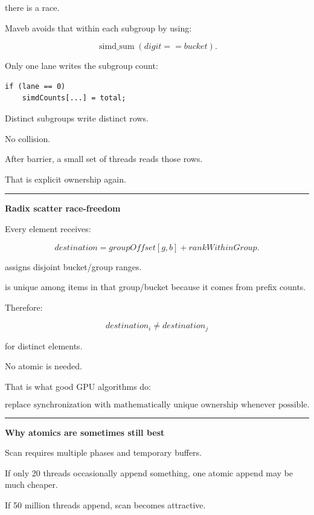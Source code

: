 there is a race.

Maveb avoids that within each subgroup by using:

\[
\operatorname{simd\_sum}(digit==bucket).
\]

Only one lane writes the subgroup count:

\protect{}\label{yjtusl}%
\begin{verbatim}
if (lane == 0)
    simdCounts[...] = total;
\end{verbatim}

Distinct subgroups write distinct rows.

No collision.

After barrier, a small set of threads reads those rows.

That is explicit ownership again.

\begin{center}\rule{0.5\linewidth}{0.5pt}\end{center}

\textbf{Radix scatter race-freedom}

Every element receives:

\[
destination=
groupOffset[g,b]
+
rankWithinGroup.
\]

 assigns disjoint bucket/group ranges.

 is unique among items in that group/bucket because it comes from prefix counts.

Therefore:

\[
destination_i
\neq
destination_j
\]

for distinct elements.

No atomic is needed.

That is what good GPU algorithms do:

\[
\boxed{
\text{replace synchronization with mathematically unique ownership whenever possible}.
}
\]

\begin{center}\rule{0.5\linewidth}{0.5pt}\end{center}

\textbf{Why atomics are sometimes still best}

Scan requires multiple phases and temporary buffers.

If only 20 threads occasionally append something, one atomic append may be much cheaper.

If 50 million threads append, scan becomes attractive.

